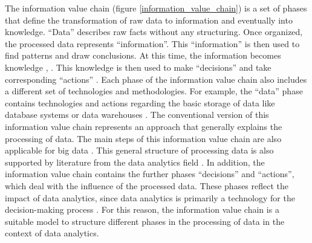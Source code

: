 The information value chain (figure \ref{information_value_chain}) is a set of phases that define the transformation of raw data to information and eventually into knowledge. \enquote{Data} describes raw facts without any structuring. Once organized, the processed data represents \enquote{information}. This \enquote{information} is then used to find patterns and draw conclusions. At this time, the information becomes knowledge \parencite{Fayyad.1996}, \cite{Fayyad.1996b}. This knowledge is then used to make \enquote{decisions} and take corresponding \enquote{actions} \parencite{Sharma.2014}. Each phase of the information value chain also includes a different set of technologies and methodologies. For example, the \enquote{data} phase contains technologies and actions regarding the basic storage of data like database systems or data warehouses \parencite{Abbasi.2016}. The conventional version of this information value chain represents an approach that generally explains the processing of data. The main steps of this information value chain are also applicable for big data \parencite{Abbasi.2016}. This general structure of processing data is also supported by literature from the data analytics field \parencite{Runkler.2020}. In addition, the information value chain contains the further phases \enquote{decisions} and \enquote{actions}, which deal with the influence of the processed data. These phases reflect the impact of data analytics, since data analytics is primarily a technology for the decision-making process \parencite{Runkler.2020}. For this reason, the information value chain is a suitable model to structure different phases in the processing of data in the context of data analytics. %




